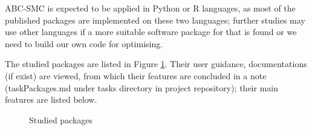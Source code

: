 \documentclass{article}
\begin{document}
ABC-SMC is expected to be applied in Python or R languages, as most of the published packages are implemented on these two languages; further studies may use other languages if a more suitable software package for that is found or we need to build our own code for optimising.

The studied packages are listed in Figure \ref{fig:2}. Their user guidance, 
documentations (if exist) are viewed, from which their features are concluded 
in a note (taskPackages.md under tasks directory in project repository);
their main features are listed below. 

\begin{figure}

	\begin{center}
	\end{center}
	
	\caption{Studied packages}
	\label{fig:2}
	
	\end{figure}
\end{document}
